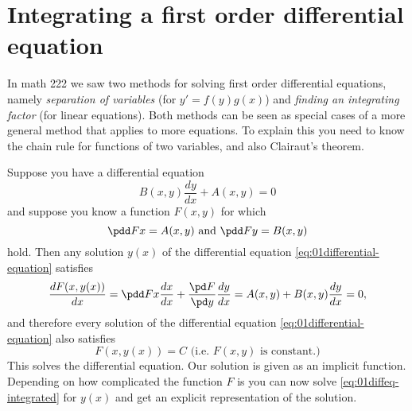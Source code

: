 \section{Integrating a first order differential equation}
In math 222 we saw two methods for solving first order differential
equations, namely \textit{separation of variables} (for $y'=f(y)g(x)$)
and \textit{finding an integrating factor} (for linear equations).
Both methods can be seen as special cases of a more general method
that applies to more equations.  To explain this you need to know the
chain rule for functions of two variables, and also Clairaut's
theorem.

Suppose you have a differential equation
\begin{equation}\label{eq:01differential-equation}
  B(x, y) \frac{d y}{d x} + A(x, y)= 0
\end{equation}
and suppose you know a function $F(x, y)$ for which
\begin{equation}\label{eq:01integral-conditions}
  \pdd Fx  = A(x, y)\text{ and }  \pdd Fy  = B(x, y) 
\end{equation}
hold.  Then any solution $y(x)$ of the differential equation
\eqref{eq:01differential-equation} satisfies
\[
\frac{dF(x, y(x))}{dx} = \pdd Fx  \frac{dx}{dx} + \frac{\pd
F}{\pd y}\frac{dy}{dx} = A(x, y) + B(x, y) \frac{dy}{dx} =0,
\]
and therefore every solution of the differential equation
\eqref{eq:01differential-equation} also satisfies
\begin{equation}
  F(x, y(x)) = C  \text{ (i.e.\ $F(x, y)$ is constant.)}
  \label{eq:01diffeq-integrated}
\end{equation}
This solves the differential equation.  Our solution is given as an
implicit function.  Depending on how complicated the function $F$ is
you can now solve \eqref{eq:01diffeq-integrated} for $y(x)$ and get an
explicit representation of the solution.

